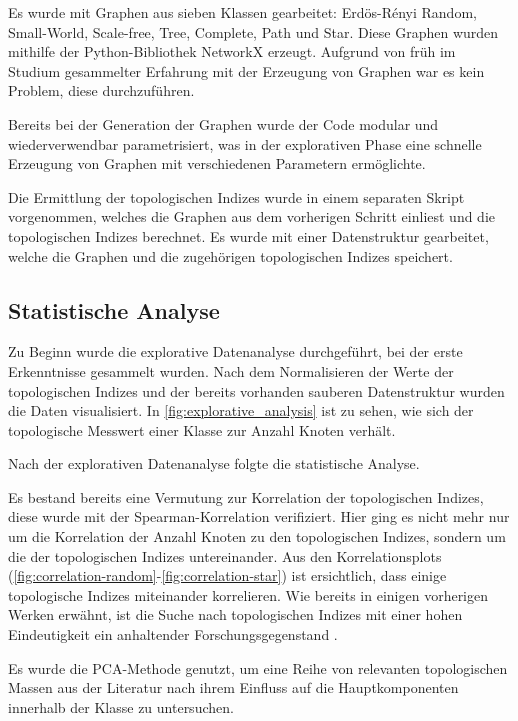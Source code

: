 Es wurde mit Graphen aus sieben Klassen gearbeitet: Erdös-Rényi Random, Small-World, Scale-free, Tree, Complete, Path und Star.
Diese Graphen wurden mithilfe der Python-Bibliothek NetworkX \cite{hagberg_exploring_2008} erzeugt.
Aufgrund von früh im Studium gesammelter Erfahrung mit der Erzeugung von Graphen war es kein Problem, diese durchzuführen.

Bereits bei der Generation der Graphen wurde der Code modular und wiederverwendbar parametrisiert, was in der explorativen Phase eine schnelle Erzeugung von Graphen mit verschiedenen Parametern ermöglichte.

Die Ermittlung der topologischen Indizes wurde in einem separaten Skript vorgenommen, welches die Graphen aus dem vorherigen Schritt einliest und die topologischen Indizes berechnet.
Es wurde mit einer Datenstruktur gearbeitet, welche die Graphen und die zugehörigen topologischen Indizes speichert.

\subsection{Statistische Analyse}

Zu Beginn wurde die explorative Datenanalyse durchgeführt, bei der erste Erkenntnisse gesammelt wurden.
Nach dem Normalisieren der Werte der topologischen Indizes und der bereits vorhanden sauberen Datenstruktur wurden die Daten visualisiert.
In \ref{fig:explorative_analysis} ist zu sehen, wie sich der topologische Messwert einer Klasse zur Anzahl Knoten verhält.

Nach der explorativen Datenanalyse folgte die statistische Analyse.

Es bestand bereits eine Vermutung zur Korrelation der topologischen Indizes, diese wurde mit der Spearman-Korrelation verifiziert.
Hier ging es nicht mehr nur um die Korrelation der Anzahl Knoten zu den topologischen Indizes, sondern um die der topologischen Indizes untereinander.
Aus den Korrelationsplots (\ref{fig:correlation-random}-\ref{fig:correlation-star}) ist ersichtlich, dass einige topologische Indizes miteinander korrelieren.
Wie bereits in einigen vorherigen Werken erwähnt, ist die Suche nach topologischen Indizes mit einer hohen Eindeutigkeit ein anhaltender Forschungsgegenstand \cite{diudea_network_2011,dehmer_information_2012}.

Es wurde die PCA-Methode genutzt, um eine Reihe von relevanten topologischen Massen aus der Literatur nach ihrem Einfluss auf die Hauptkomponenten innerhalb der Klasse zu untersuchen.

